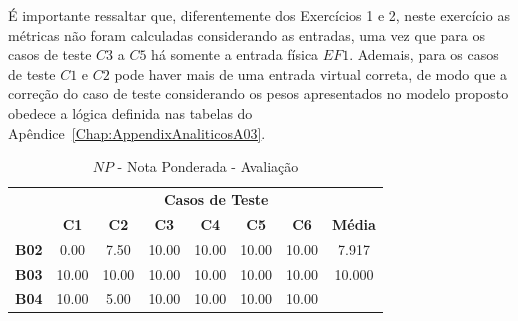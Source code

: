 É importante ressaltar que, diferentemente dos Exercícios 1 e 2, neste exercício as métricas não foram calculadas considerando as entradas, uma vez que para os casos de teste $C3$ a $C5$ há somente a entrada física $EF1$. Ademais, para os casos de teste $C1$ e $C2$ pode haver mais de uma entrada virtual correta, de modo que a correção do caso de teste considerando os pesos apresentados no modelo proposto obedece a lógica definida nas tabelas do Apêndice~\ref{Chap:AppendixAnaliticosA03}.

\begin{table}[htbp]
	\centering
	\caption{$NP$ - Nota Ponderada - Avaliação}
	\begin{tabular}{|c|ccccccc|}
		\hline
		\rowcolor[HTML]{D0CECE} 
		\cellcolor[HTML]{D0CECE} &
		\multicolumn{7}{c|}{\cellcolor[HTML]{D0CECE}\textbf{Casos de Teste}} \\ \cline{2-8} 
		\rowcolor[HTML]{D9D9D9} 
		\multirow{-2}{*}{\cellcolor[HTML]{D0CECE}\textbf{Participante}} &
		\multicolumn{1}{c|}{\cellcolor[HTML]{D9D9D9}\textbf{C1}} &
		\multicolumn{1}{c|}{\cellcolor[HTML]{D9D9D9}\textbf{C2}} &
		\multicolumn{1}{c|}{\cellcolor[HTML]{D9D9D9}\textbf{C3}} &
		\multicolumn{1}{c|}{\cellcolor[HTML]{D9D9D9}\textbf{C4}} &
		\multicolumn{1}{c|}{\cellcolor[HTML]{D9D9D9}\textbf{C5}} &
		\multicolumn{1}{c|}{\cellcolor[HTML]{D9D9D9}\textbf{C6}} &
		\textbf{Média} \\ \hline
		\textbf{B02} &
		\multicolumn{1}{c|}{\cellcolor[HTML]{FFFFFF}0.00} &
		\multicolumn{1}{c|}{\cellcolor[HTML]{FFFFFF}7.50} &
		\multicolumn{1}{c|}{\cellcolor[HTML]{FFFFFF}10.00} &
		\multicolumn{1}{c|}{\cellcolor[HTML]{FFFFFF}10.00} &
		\multicolumn{1}{c|}{\cellcolor[HTML]{FFFFFF}10.00} &
		\multicolumn{1}{c|}{\cellcolor[HTML]{FFFFFF}10.00} &
		7.917 \\ \hline
		\rowcolor[HTML]{F2F2F2} 
		\textbf{B03} &
		\multicolumn{1}{c|}{\cellcolor[HTML]{F2F2F2}10.00} &
		\multicolumn{1}{c|}{\cellcolor[HTML]{F2F2F2}10.00} &
		\multicolumn{1}{c|}{\cellcolor[HTML]{F2F2F2}10.00} &
		\multicolumn{1}{c|}{\cellcolor[HTML]{F2F2F2}10.00} &
		\multicolumn{1}{c|}{\cellcolor[HTML]{F2F2F2}10.00} &
		\multicolumn{1}{c|}{\cellcolor[HTML]{F2F2F2}10.00} &
		10.000 \\ \hline
		\textbf{B04} &
		\multicolumn{1}{c|}{\cellcolor[HTML]{FFFFFF}10.00} &
		\multicolumn{1}{c|}{\cellcolor[HTML]{FFFFFF}5.00} &
		\multicolumn{1}{c|}{\cellcolor[HTML]{FFFFFF}10.00} &
		\multicolumn{1}{c|}{\cellcolor[HTML]{FFFFFF}10.00} &
		\multicolumn{1}{c|}{\cellcolor[HTML]{FFFFFF}10.00} &
		\multicolumn{1}{c|}{\cellcolor[HTML]{FFFFFF}10.00} &

\end{tabular}
\end{table}

